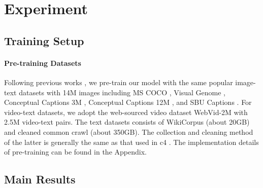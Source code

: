 \documentclass{article}
\theoremstyle{plain}
\theoremstyle{definition}
\theoremstyle{remark}
\begin{document}
\vspace{-2ex}
\section{Experiment}
\subsection{Training Setup}
\paragraph{Pre-training Datasets}
Following previous works \citep{li2021align, Li2022mPLUGEA}, we pre-train our model with the same popular image-text datasets with 14M images including MS COCO \citep{lin2014microsoft}, Visual Genome \citep{krishna2017visual}, Conceptual Captions 3M \citep{sharma2018conceptual}, Conceptual Captions 12M \citep{changpinyo2021conceptual}, and SBU Captions \citep{Ordonez2011Im2TextDI}. For video-text datasets, we adopt the web-sourced video dataset WebVid-2M \citep{Bain2021FrozenIT} with 2.5M video-text pairs. The text datasets consists of WikiCorpus \citep{devlin2018bert} (about 20GB) and cleaned common crawl (about 350GB). The collection and cleaning method of the latter is generally the same as that used in c4 \citep{Colin2020T5}. The implementation details of pre-training can be found in the Appendix. 







\vspace{-2ex}
\subsection{Main Results}
\end{document}
